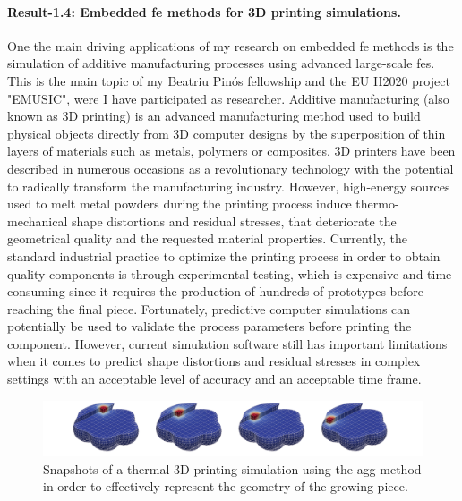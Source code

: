 \documentclass{article}
\begin{document}
\paragraph{Result-1.4: Embedded \ac{fe} methods for 3D printing simulations.}

One the main driving applications of my research on embedded \ac{fe} methods is {{the simulation of additive manufacturing processes using advanced large-scale \acp{fe}}}. This is the main topic of my Beatriu Pinós fellowship and the {{EU H2020 project "EMUSIC"}}, were I have participated as researcher. Additive manufacturing (also known as 3D printing) is an advanced manufacturing method used to build physical objects directly from 3D computer designs by the superposition of thin layers of materials such as metals, polymers or composites. 3D printers have been described in numerous occasions as a revolutionary technology with the potential to radically transform the manufacturing industry. However, high-energy sources used to melt metal powders during the printing process induce thermo-mechanical shape distortions and residual stresses, that deteriorate the geometrical quality and the requested material properties. Currently, the standard industrial practice  to optimize the printing process in order to obtain quality components is through experimental testing, which is expensive and time consuming since it requires the production of hundreds of prototypes before reaching the final piece. Fortunately, predictive computer simulations can potentially be used to validate the process parameters before printing the component. However, current simulation software still has important limitations when it comes to predict shape distortions and residual stresses in complex settings with an acceptable level of accuracy and an acceptable time frame. 

\begin{figure}[ht!]
\includegraphics[width=\textwidth]{../_assets/fig6.png}
\caption{Snapshots of a thermal 3D printing simulation using the \ac{agg} method in order to effectively represent the geometry of the growing piece.}
\label{fig:AM-AggFEM}
\end{figure}
\end{document}
